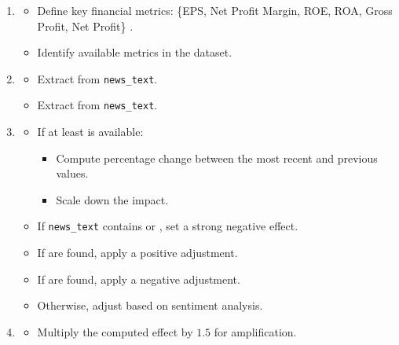 \documentclass[3p,times,procedia]{elsarticle}
\begin{document}
 \cite{Zhang2006}
\begin{enumerate}
    \item {}
    \begin{itemize}
        \item Define key financial metrics: 
        \{EPS, Net Profit Margin, ROE, ROA, Gross Profit, Net Profit\} \cite{Fama1995}.
        \item Identify available metrics in the dataset.
    \end{itemize}

    \item {}
    \begin{itemize}
        \item Extract  from \texttt{news\_text}.
        \item Extract  from \texttt{news\_text}.
    \end{itemize}


    \item {}
    \begin{itemize}
        \item If at least  is available:
        \begin{itemize}
            \item Compute percentage change between the most recent and previous values.
            \item Scale down the impact.
        \end{itemize}
        \item If \texttt{news\_text} contains  or , set a strong negative effect.
        \item If  are found, apply a positive adjustment.
        \item If  are found, apply a negative adjustment.
        \item Otherwise, adjust based on sentiment analysis.
    \end{itemize}

    \item {}
    \begin{itemize}
        \item Multiply the computed effect by $1.5$ for amplification.
    \end{itemize}
\end{enumerate}
\end{document}
